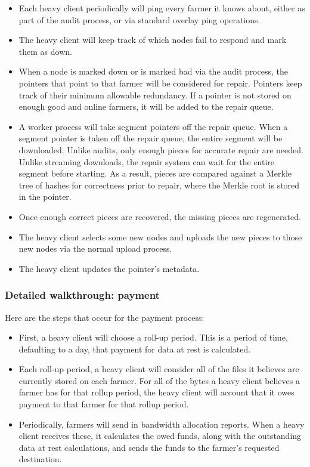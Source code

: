 \documentclass[a4paper,10pt]{article} \usepackage[utf8]{inputenc}
\begin{document}
\begin{itemize}
\item Each heavy client periodically will ping every farmer it knows about,
  either as part of the audit process, or via standard overlay ping operations.
\item The heavy client will keep track of which nodes fail to respond and mark
  them as down.
\item When a node is marked down or is marked bad via the audit process, the
  pointers that point to that farmer will be considered for repair. Pointers
  keep track of their minimum allowable redundancy. If a pointer is not stored
  on enough good and online farmers, it will be added to the repair queue.
\item A worker process will take segment pointers off the repair queue. When
  a segment pointer is taken off the repair queue, the entire segment will be
  downloaded. Unlike audits, only enough pieces for accurate repair are needed.
  Unlike streaming downloads, the repair system can wait for the entire segment
  before starting. As a result, pieces are compared against a Merkle tree of
  hashes for correctness prior to repair, where the Merkle root is stored in
  the pointer.
\item Once enough correct pieces are recovered, the missing pieces are
  regenerated.
\item The heavy client selects some new nodes and uploads the new pieces to
  those new nodes via the normal upload process.
\item The heavy client updates the pointer's metadata.
\end{itemize}

\subsubsection{Detailed walkthrough: payment}

Here are the steps that occur for the payment process: 

\begin{itemize}
\item First, a heavy client will choose a roll-up period. This is a period of
  time, defaulting to a day, that payment for data at rest is calculated.
\item Each roll-up period, a heavy client will consider all of the files it
  believes are currently stored on each farmer. For all of the bytes a heavy
  client believes a farmer has for that rollup period, the heavy client will
  account that it owes payment to that farmer for that rollup period.
\item Periodically, farmers will send in bandwidth allocation reports. When a
  heavy client receives these, it calculates the owed funds, along with the
  outstanding data at rest calculations, and sends the funds to the farmer's
  requested destination.
\end{itemize}
\end{document}
